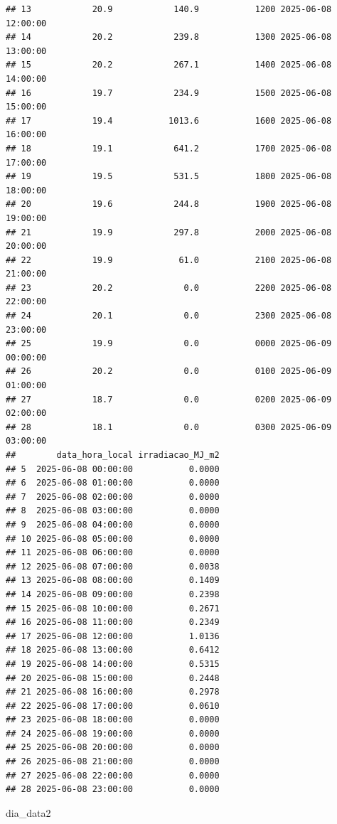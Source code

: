 \documentclass[
]{article}
\newenvironment{Shaded}{\begin{snugshade}}{\end{snugshade}}
\newcommand{\NormalTok}[1]{#1}
\begin{document}
\begin{verbatim}
## 13            20.9            140.9           1200 2025-06-08 12:00:00
## 14            20.2            239.8           1300 2025-06-08 13:00:00
## 15            20.2            267.1           1400 2025-06-08 14:00:00
## 16            19.7            234.9           1500 2025-06-08 15:00:00
## 17            19.4           1013.6           1600 2025-06-08 16:00:00
## 18            19.1            641.2           1700 2025-06-08 17:00:00
## 19            19.5            531.5           1800 2025-06-08 18:00:00
## 20            19.6            244.8           1900 2025-06-08 19:00:00
## 21            19.9            297.8           2000 2025-06-08 20:00:00
## 22            19.9             61.0           2100 2025-06-08 21:00:00
## 23            20.2              0.0           2200 2025-06-08 22:00:00
## 24            20.1              0.0           2300 2025-06-08 23:00:00
## 25            19.9              0.0           0000 2025-06-09 00:00:00
## 26            20.2              0.0           0100 2025-06-09 01:00:00
## 27            18.7              0.0           0200 2025-06-09 02:00:00
## 28            18.1              0.0           0300 2025-06-09 03:00:00
##        data_hora_local irradiacao_MJ_m2
## 5  2025-06-08 00:00:00           0.0000
## 6  2025-06-08 01:00:00           0.0000
## 7  2025-06-08 02:00:00           0.0000
## 8  2025-06-08 03:00:00           0.0000
## 9  2025-06-08 04:00:00           0.0000
## 10 2025-06-08 05:00:00           0.0000
## 11 2025-06-08 06:00:00           0.0000
## 12 2025-06-08 07:00:00           0.0038
## 13 2025-06-08 08:00:00           0.1409
## 14 2025-06-08 09:00:00           0.2398
## 15 2025-06-08 10:00:00           0.2671
## 16 2025-06-08 11:00:00           0.2349
## 17 2025-06-08 12:00:00           1.0136
## 18 2025-06-08 13:00:00           0.6412
## 19 2025-06-08 14:00:00           0.5315
## 20 2025-06-08 15:00:00           0.2448
## 21 2025-06-08 16:00:00           0.2978
## 22 2025-06-08 17:00:00           0.0610
## 23 2025-06-08 18:00:00           0.0000
## 24 2025-06-08 19:00:00           0.0000
## 25 2025-06-08 20:00:00           0.0000
## 26 2025-06-08 21:00:00           0.0000
## 27 2025-06-08 22:00:00           0.0000
## 28 2025-06-08 23:00:00           0.0000
\end{verbatim}

\begin{Shaded}
\begin{Highlighting}[]
\NormalTok{dia\_data2}
\end{Highlighting}
\end{Shaded}
\end{document}
